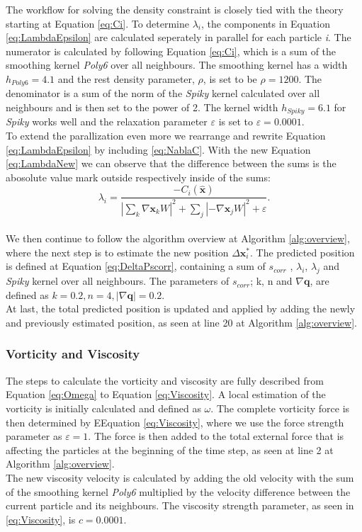 The workflow for solving the density constraint is closely tied with the theory starting at Equation \ref{eq:Ci}. 
To determine $\lambda_{i}$, the components in Equation \ref{eq:LambdaEpsilon} are calculated seperately in parallel 
for each particle \textit{i}.
The numerator is calculated by following Equation \ref{eq:Ci}, which is a sum of the smoothing kernel \textit{Poly6} over 
all neighbours. The smoothing kernel has a width $h_{Poly6} = 4.1$ and the rest density parameter, $\rho$, is set to be $\rho = 1200$. 
The denominator is a sum of the norm of the \textit{Spiky} kernel calculated over all neighbours 
and is then set to the power of 2. The kernel width $h_{Spiky} = 6.1$ for \textit{Spiky} works well and the 
relaxation parameter $\varepsilon$ is set to $\varepsilon = 0.0001$.
\\
\newline
To extend the parallization even more we rearrange and rewrite Equation \ref{eq:LambdaEpsilon} by including \ref{eq:NablaC}. With the 
new Equation \ref{eq:LambdaNew} we can observe that the difference between the sums is the abosolute value mark 
outside respectively inside of the sums: 
\\
\begin{equation}
\label{eq:LambdaNew}
\lambda_i = \frac{- C_i(\hat{\mathbf{x}}) }{ |\sum\limits_{k} \nabla \mathbf{x}_k W|^{2} + \sum\limits_{j} |-\nabla \mathbf{x}_j W|^2  + \varepsilon}.
\end{equation}
\\
\newline
We then continue to follow the algorithm overview at Algorithm \ref{alg:overview}, where the next step is to estimate the new position $\Delta \mathbf{x}^{*}_{i}$.
The predicted position is defined at Equation \ref{eq:DeltaPscorr}, containing a sum of $s_{corr}$ , $\lambda_{i}$, $\lambda_{j}$ 
and \textit{Spiky} kernel over all neighbours. 
The parameters of $s_{corr}$; k, n and $ \nabla \mathbf{q}$, are defined as $k = 0.2, n = 4, |\nabla \mathbf{q}| = 0.2$. 
\\
At last, the total predicted position is updated and applied by adding the newly and previously estimated position, 
as seen at line 20 at Algorithm \ref{alg:overview}.

\subsubsection{Vorticity and Viscosity}
The steps to calculate the vorticity and viscosity are fully described from Equation \ref{eq:Omega} to Equation \ref{eq:Viscosity}.
A local estimation of the vorticity is initially calculated and defined as $\omega$. The complete vorticity force is then determined 
by EEquation \ref{eq:Viscosity}, where we use the force strength parameter as $\varepsilon = 1$. The force is then added to the total 
external force that is affecting the particles at the beginning of the time step, as seen at line 2 at Algorithm \ref{alg:overview}. 
\\
The new viscosity velocity is calculated by adding the old velocity with the sum of the smoothing kernel \textit{Poly6} multiplied by the velocity difference between 
the current particle and its neighbours. The viscosity strength parameter, as seen in \ref{eq:Viscosity}, is $c = 0.0001$. 